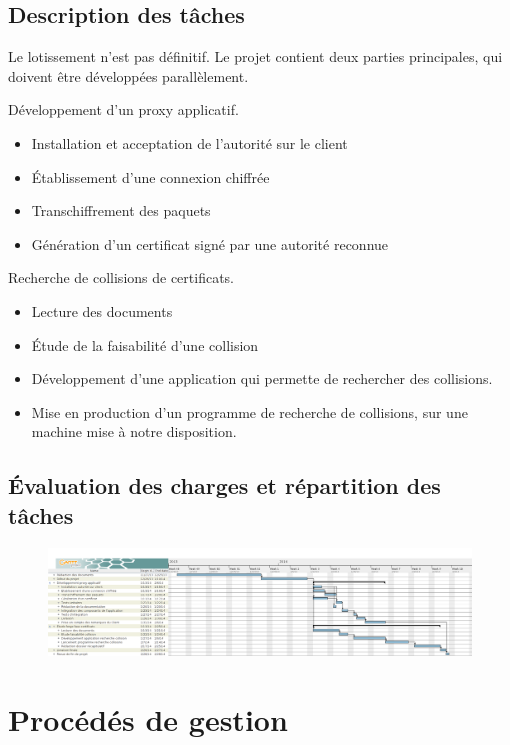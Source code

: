 \documentclass[a4paper,11pt,french]{article}
\begin{document}
\subsection{Description des tâches}

Le lotissement n'est pas définitif. Le projet contient deux parties principales, qui doivent être développées parallèlement.

Développement d'un proxy applicatif.
\begin{itemize}
\item Installation et acceptation de l'autorité sur le client
\item Établissement d'une connexion chiffrée
\item Transchiffrement des paquets
\item Génération d'un certificat signé par une autorité reconnue
\end{itemize}
Recherche de collisions de certificats.
\begin{itemize}
\item Lecture des documents
\item Étude de la faisabilité d'une collision
\item Développement d'une application qui permette de rechercher des collisions.
\item Mise en production d'un programme de recherche de collisions, sur une machine mise à notre disposition.
\end{itemize}
\subsection{Évaluation des charges et répartition des tâches}

\begin{figure}[h!]
\includegraphics[width=\textheight, angle=90]{planification.png}
\end{figure}

\newpage
\section{Procédés de gestion}
\end{document}
